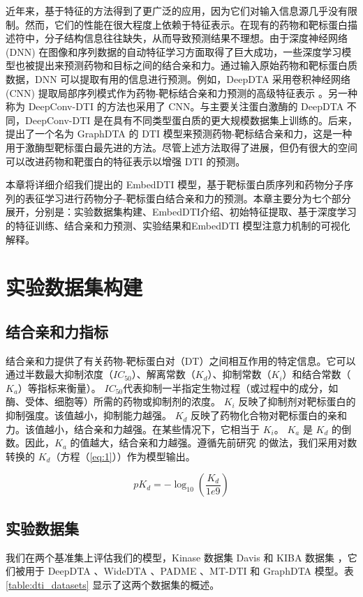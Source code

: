 近年来，基于特征的方法得到了更广泛的应用，因为它们对输入信息源几乎没有限制。然而，它们的性能在很大程度上依赖于特征表示。在现有的药物和靶标蛋白描述符中，分子结构信息往往缺失，从而导致预测结果不理想。由于深度神经网络 (DNN) 在图像和序列数据的自动特征学习方面取得了巨大成功，一些深度学习模型也被提出来预测药物和目标之间的结合亲和力。通过输入原始药物和靶标蛋白质数据，DNN 可以提取有用的信息进行预测。例如，DeepDTA 采用卷积神经网络 (CNN) 提取局部序列模式作为药物-靶标结合亲和力预测的高级特征表示 \cite{ozturk2018deepdta}。另一种称为 DeepConv-DTI \cite{lee2019deepconv} 的方法也采用了 CNN。与主要关注蛋白激酶的 DeepDTA 不同，DeepConv-DTI 是在具有不同类型蛋白质的更大规模数据集上训练的。后来，提出了一个名为 GraphDTA \cite{nguyen2019graphdta} 的 DTI 模型来预测药物-靶标结合亲和力，这是一种用于激酶型靶标蛋白最先进的方法。尽管上述方法取得了进展，但仍有很大的空间可以改进药物和靶蛋白的特征表示以增强 DTI 的预测。

本章将详细介绍我们提出的 EmbedDTI 模型，基于靶标蛋白质序列和药物分子序列的表征学习进行药物分子-靶标蛋白结合亲和力的预测。本章主要分为七个部分展开，分别是：实验数据集构建、EmbedDTI介绍、初始特征提取、基于深度学习的特征训练、结合亲和力预测、实验结果和EmbedDTI 模型注意力机制的可视化解释。

\section{实验数据集构建}

\subsection{结合亲和力指标}
结合亲和力提供了有关药物-靶标蛋白对（DT）之间相互作用的特定信息。它可以通过半数最大抑制浓度（$IC_{50}$）、解离常数（$K_d$）、抑制常数（$K_i$）和结合常数（$K_a$）等指标来衡量）。 $IC_{50}$代表抑制一半指定生物过程（或过程中的成分，如酶、受体、细胞等）所需的药物或抑制剂的浓度。 $K_i$ 反映了抑制剂对靶标蛋白的抑制强度。该值越小，抑制能力越强。 $K_d$ 反映了药物化合物对靶标蛋白的亲和力。该值越小，结合亲和力越强。在某些情况下，它相当于 $K_i$。 $K_a$ 是 $K_d$ 的倒数。因此，$K_a$ 的值越大，结合亲和力越强。遵循先前研究 \cite{he2017simboost} 的做法，我们采用对数转换的 $K_d$（方程（\ref{eq:1}））作为模型输出。

\begin{equation}
  pK_d = - \log_{10}{(\frac{K_d}{1e9})}
\label{eq:1}
\end{equation}

\subsection{实验数据集}
我们在两个基准集上评估我们的模型，Kinase 数据集 Davis \cite{davis2011comprehensive} 和 KIBA 数据集 \cite{tang2014making}，它们被用于 DeepDTA \cite{ozturk2018deepdta}、WideDTA \cite{ozturk2019widedta}、PADME \cite{feng2018padme}、MT-DTI \cite{shin2019self} 和 GraphDTA \cite{nguyen2019graphdta}模型。表 \ref{table:dti_datasets} 显示了这两个数据集的概述。

